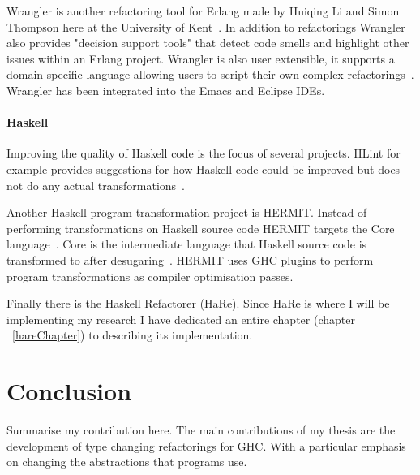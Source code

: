 Wrangler is another refactoring tool for Erlang made by Huiqing Li and Simon Thompson here at the University of Kent~\citep{refacTools}. In addition to refactorings Wrangler also provides "decision support tools" that detect code smells and highlight other issues within an Erlang project. Wrangler is also user extensible, it supports a domain-specific language allowing users to script their own complex refactorings~\citep{refacTools}. Wrangler has been integrated into the Emacs and Eclipse IDEs.

\subsubsection{Haskell}

Improving the quality of Haskell code is the focus of several projects. HLint for example provides suggestions for how Haskell code could be improved but does not do any actual transformations~\citep{hlint}.

Another Haskell program transformation project is HERMIT. Instead of performing transformations on Haskell source code HERMIT targets the Core language~\citep{hermit}. Core is the intermediate language that Haskell source code is transformed to after desugaring~\citep{ghcDesign}. HERMIT uses GHC plugins to perform program transformations as compiler optimisation passes. 

Finally there is the Haskell Refactorer (HaRe). Since HaRe is where I will be implementing my research I have dedicated an entire chapter (chapter ~\ref{hareChapter}) to describing its implementation. 


\chapter{Conclusion}
Summarise my contribution here. The main contributions of my thesis are the development of type changing refactorings for GHC. With a particular emphasis on changing the abstractions that programs use.



\cleardoublepage
{}
\label{index}
\printindex


